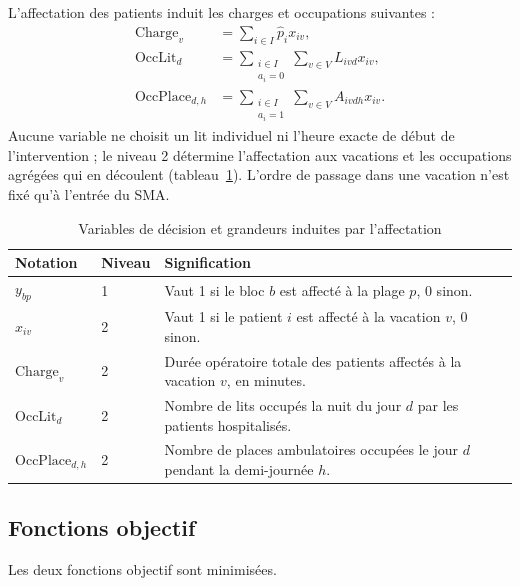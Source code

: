 \documentclass[11pt,a4paper]{article}
\begin{document}
L'affectation des patients induit les charges et occupations suivantes :
\begin{align}
\mathrm{Charge}_v&=\sum_{i\in I}\widehat p_i x_{iv},\label{eq:charge_v}\\
\mathrm{OccLit}_d&=\sum_{\substack{i\in I\\a_i=0}}\sum_{v\in V}L_{ivd}x_{iv},\label{eq:occ_lit}\\
\mathrm{OccPlace}_{d,h}&=\sum_{\substack{i\in I\\a_i=1}}\sum_{v\in V}A_{ivdh}x_{iv}.\label{eq:occ_place}
\end{align}
Aucune variable ne choisit un lit individuel ni l'heure exacte de début de l'intervention ; le niveau 2 détermine l'affectation aux vacations et les occupations agrégées qui en découlent (tableau~\ref{tab:variables}). L'ordre de passage dans une vacation n'est fixé qu'à l'entrée du SMA.

\begin{table}[htbp]
\centering\footnotesize
\caption{Variables de décision et grandeurs induites par l'affectation}
\label{tab:variables}
\begin{tabularx}{\linewidth}{@{}p{2.6cm}p{2.0cm}X@{}}
\toprule
\textbf{Notation} & \textbf{Niveau} & \textbf{Signification} \\
\midrule
$y_{bp}$ & 1 & Vaut 1 si le bloc $b$ est affecté à la plage $p$, 0 sinon. \\
$x_{iv}$ & 2 & Vaut 1 si le patient $i$ est affecté à la vacation $v$, 0 sinon. \\
$\mathrm{Charge}_v$ & 2 & Durée opératoire totale des patients affectés à la vacation $v$, en minutes. \\
$\mathrm{OccLit}_d$ & 2 & Nombre de lits occupés la nuit du jour $d$ par les patients hospitalisés. \\
$\mathrm{OccPlace}_{d,h}$ & 2 & Nombre de places ambulatoires occupées le jour $d$ pendant la demi-journée $h$. \\
\bottomrule
\end{tabularx}
\end{table}

\subsection{Fonctions objectif}

Les deux fonctions objectif sont minimisées.
\end{document}
